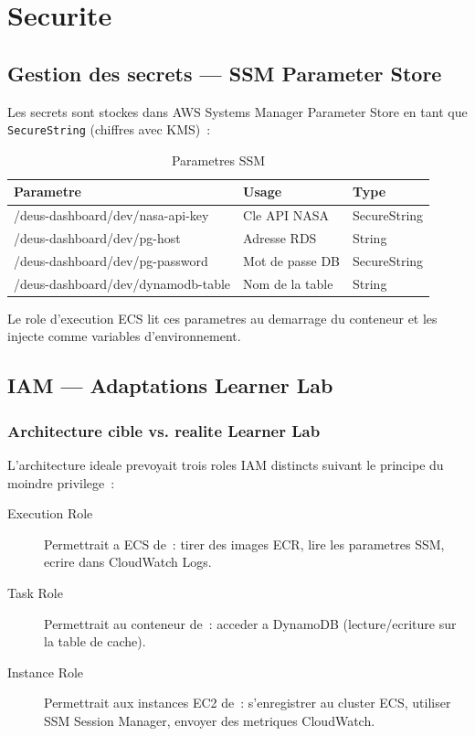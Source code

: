 \chapter{Securite}

\section{Gestion des secrets --- SSM Parameter Store}

Les secrets sont stockes dans AWS Systems Manager Parameter Store
en tant que \texttt{SecureString} (chiffres avec KMS)~:

\begin{table}[H]
    \centering
    \begin{tabularx}{\textwidth}{lXl}
        \toprule
        \textbf{Parametre} & \textbf{Usage} & \textbf{Type} \\
        \midrule
        /deus-dashboard/dev/nasa-api-key & Cle API NASA & SecureString \\
        /deus-dashboard/dev/pg-host & Adresse RDS & String \\
        /deus-dashboard/dev/pg-password & Mot de passe DB & SecureString \\
        /deus-dashboard/dev/dynamodb-table & Nom de la table & String \\
        \bottomrule
    \end{tabularx}
    \caption{Parametres SSM}
\end{table}

Le role d'execution ECS lit ces parametres au demarrage du conteneur
et les injecte comme variables d'environnement.

\section{IAM --- Adaptations Learner Lab}

\subsection{Architecture cible vs. realite Learner Lab}

L'architecture ideale prevoyait trois roles IAM distincts suivant le
principe du moindre privilege~:

\begin{description}
    \item[Execution Role] Permettrait a ECS de~: tirer des images ECR,
        lire les parametres SSM, ecrire dans CloudWatch Logs.
    \item[Task Role] Permettrait au conteneur de~: acceder a DynamoDB
        (lecture/ecriture sur la table de cache).
    \item[Instance Role] Permettrait aux instances EC2 de~: s'enregistrer
        au cluster ECS, utiliser SSM Session Manager, envoyer des metriques CloudWatch.
\end{description}

